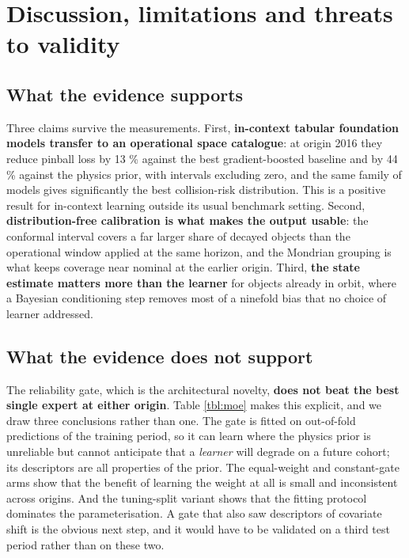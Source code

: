 \documentclass[3p,times,twocolumn]{elsarticle}
\begin{document}
\section{Discussion, limitations and threats to
validity}\label{sec:discussion}

\subsection{What the evidence
supports}\label{what-the-evidence-supports}

Three claims survive the measurements. First, \textbf{in-context tabular
foundation models transfer to an operational space catalogue}: at origin
2016 they reduce pinball loss by 13 \% against the best gradient-boosted
baseline and by 44 \% against the physics prior, with intervals
excluding zero, and the same family of models gives significantly the
best collision-risk distribution. This is a positive result for
in-context learning outside its usual benchmark setting. Second,
\textbf{distribution-free calibration is what makes the output usable}:
the conformal interval covers a far larger share of decayed objects than
the operational window applied at the same horizon, and the Mondrian
grouping is what keeps coverage near nominal at the earlier origin.
Third, \textbf{the state estimate matters more than the learner} for
objects already in orbit, where a Bayesian conditioning step removes
most of a ninefold bias that no choice of learner addressed.

\subsection{What the evidence does not
support}\label{what-the-evidence-does-not-support}

The reliability gate, which is the architectural novelty, \textbf{does
not beat the best single expert at either origin}. Table \ref{tbl:moe}
makes this explicit, and we draw three conclusions rather than one. The
gate is fitted on out-of-fold predictions of the training period, so it
can learn where the physics prior is unreliable but cannot anticipate
that a \emph{learner} will degrade on a future cohort; its descriptors
are all properties of the prior. The equal-weight and constant-gate arms
show that the benefit of learning the weight at all is small and
inconsistent across origins. And the tuning-split variant shows that the
fitting protocol dominates the parameterisation. A gate that also saw
descriptors of covariate shift is the obvious next step, and it would
have to be validated on a third test period rather than on these two.
\end{document}
